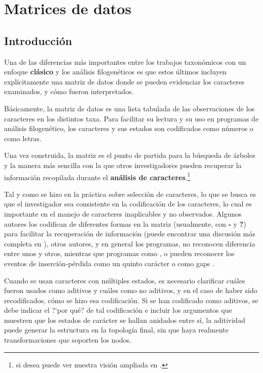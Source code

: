 \chapter{Matrices de datos}
\label{cha:matrices}

\section*{Introducci\'on}

Una de las diferencias m\'as importantes entre los trabajos taxon\'omicos con un enfoque \textbf{cl\'asico} y los an\'alisis filogen\'eticos es que estos \'ultimos incluyen expl\'icitamente una matriz de datos donde se pueden evidenciar los caracteres examinados, y c\'omo fueron interpretados.

B\'asicamente, la matriz de datos es una lista tabulada de las observaciones de los caracteres en los distintos taxa. Para facilitar su lectura y su uso en programas de an\'alisis filogen\'etico, los caracteres y sus estados son codificados como n\'umeros o como letras.

Una vez construida, la matriz es el punto de partida para la b\'usqueda de \'arboles y la manera m\'as sencilla con la que otros investigadores pueden recuperar la informaci\'on recopilada durante el \textbf{an\'alisis de caracteres}.\footnote{si desea puede ver nuestra visi\'on ampliada en \cite{Mirandaetal2004}.}

Tal y como se hizo en la pr\'actica sobre selecci\'on de caracteres, lo que se busca es que el investigador sea consistente en la codificaci\'on de los caracteres, lo cual es importante en el manejo de caracteres inaplicables y no observados. Algunos autores los codifican de diferentes formas en la matriz (usualmente, con \textbf {-} y \textbf {?}) para facilitar la recuperaci\'on de informaci\'on (puede encontrar una discusi\'on m\'as completa en \cite{Strong1999}), otros autores, y en general los programas, no reconocen diferencia entre unos y otros, mientras que programas como ,  o  pueden reconocer los eventos de inserci\'on-p\'erdida como un quinto car\'acter o como gaps \citep{Giribet1999}.

Cuando se usan caracteres con m\'ultiples estados, es necesario {cla}{ri}{fi}{car} cu\'ales fueron usados como aditivos y cu\'ales como no aditivos, y en el caso de haber sido recodificados, c\'omo se hizo esa codificaci\'on. 
Si se han codificado como aditivos, se debe indicar el ?`por qu\'e? de tal codificaci\'on e incluir los argumentos que muestren que los estados de car\'acter se hallan anidados entre s\'i, la aditividad puede generar la estructura en la topolog\'ia final, sin que haya realmente transformaciones que soporten los nodos.

